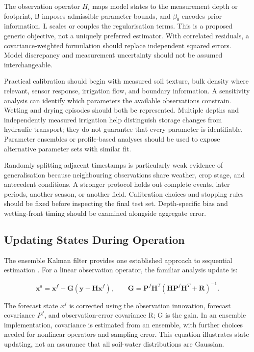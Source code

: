 \documentclass[11pt,a4paper]{article}
\begin{document}
The observation operator $H_{i}$ maps model states to the measurement depth or footprint, B imposes admissible parameter bounds, and $\beta_{0}$ encodes prior information. L scales or couples the regularisation terms. This is a proposed generic objective, not a uniquely preferred estimator. With correlated residuals, a covariance-weighted formulation should replace independent squared errors. Model discrepancy and measurement uncertainty should not be assumed interchangeable.

Practical calibration should begin with measured soil texture, bulk density where relevant, sensor response, irrigation flow, and boundary information. A sensitivity analysis can identify which parameters the available observations constrain. Wetting and drying episodes should both be represented. Multiple depths and independently measured irrigation help distinguish storage changes from hydraulic transport; they do not guarantee that every parameter is identifiable. Parameter ensembles or profile-based analyses should be used to expose alternative parameter sets with similar fit.

Randomly splitting adjacent timestamps is particularly weak evidence of generalisation because neighbouring observations share weather, crop stage, and antecedent conditions. A stronger protocol holds out complete events, later periods, another season, or another field. Calibration choices and stopping rules should be fixed before inspecting the final test set. Depth-specific bias and wetting-front timing should be examined alongside aggregate error.

\subsection{Updating States During Operation}

\label{sec:5-2}

The ensemble Kalman filter provides one established approach to sequential estimation \cite{R12}. For a linear observation operator, the familiar analysis update is:

\begin{equation}
\mathbf x^{a}=\mathbf x^{f}+\mathbf G(\mathbf y-\mathbf H\mathbf x^{f}),\qquad \mathbf G=\mathbf P^{f}\mathbf H^{T}\left(\mathbf H\mathbf P^{f}\mathbf H^{T}+\mathbf R\right)^{-1}.
\label{eq:8}
\end{equation}

The forecast state $x^{f}$ is corrected using the observation innovation, forecast covariance $P^{f}$, and observation-error covariance R; G is the gain. In an ensemble implementation, covariance is estimated from an ensemble, with further choices needed for nonlinear operators and sampling error. This equation illustrates state updating, not an assurance that all soil-water distributions are Gaussian.
\end{document}
